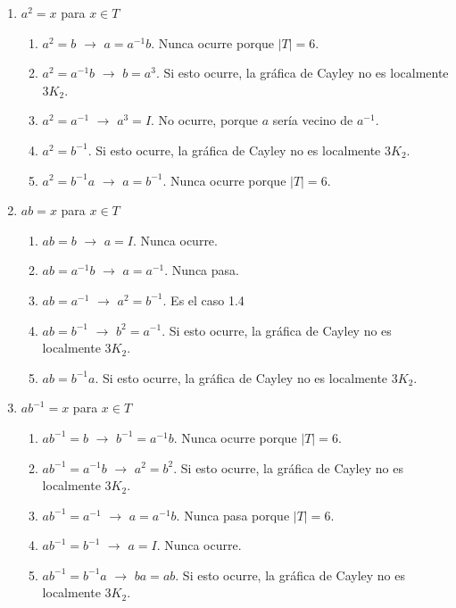 \documentclass[11pt]{book}
\theoremstyle{definition}
\begin{document}
\begin{enumerate}

\item $a^{2}=x$ para $x\in T$
  \begin{enumerate}
  \item $a^2=b$ $\rightarrow$ $a=a^{-1}b$. Nunca ocurre porque
    $|T|=6$.
  \item $a^2=a^{-1}b$ $\rightarrow$ $b=a^3$. Si esto ocurre, la
    gráfica de Cayley no es localmente $3K_2$.
  \item $a^2=a^{-1}$ $\rightarrow$ $a^3=I$. No ocurre, porque $a$
    sería vecino de $a^{-1}$.
  \item $a^2=b^{-1}$.  Si esto ocurre, la gráfica de Cayley no es
    localmente $3K_2$.
  \item $a^2=b^{-1}a$ $\rightarrow$ $a=b^{-1}$. Nunca ocurre porque
    $|T|=6$.

  \end{enumerate}

\item $ab=x$ para $x\in T$
  \begin{enumerate}
  \item $ab=b$ $\rightarrow$ $a=I$. Nunca ocurre.
  \item $ab=a^{-1}b$ $\rightarrow$ $a=a^{-1}$. Nunca pasa.
  \item $ab=a^{-1}$ $\rightarrow$ $a^2=b^{-1}$. Es el caso 1.4
  \item $ab=b^{-1}$ $\rightarrow$ $b^2=a^{-1}$. Si esto ocurre, la
    gráfica de Cayley no es localmente $3K_2$.
  \item $ab=b^{-1}a$. Si esto ocurre, la gráfica de Cayley no es
    localmente $3K_2$.
  \end{enumerate}

\item $ab^{-1}=x$ para $x\in T$
  \begin{enumerate}
  \item $ab^{-1}=b$ $\rightarrow$ $b^{-1}=a^{-1}b$. Nunca ocurre
    porque $|T|=6$.
  \item $ab^{-1}=a^{-1}b$ $\rightarrow$ $a^2=b^2$. Si esto ocurre, la
    gráfica de Cayley no es localmente $3K_2$.
  \item $ab^{-1}=a^{-1}$ $\rightarrow$ $a=a^{-1}b$. Nunca pasa porque
    $|T|=6$.
  \item $ab^{-1}=b^{-1}$ $\rightarrow$ $a=I$. Nunca ocurre.
  \item $ab^{-1}=b^{-1}a$ $\rightarrow$ $ba=ab$. Si esto ocurre, la
    gráfica de Cayley no es localmente $3K_2$.
  \end{enumerate}


\end{enumerate}
\end{document}
